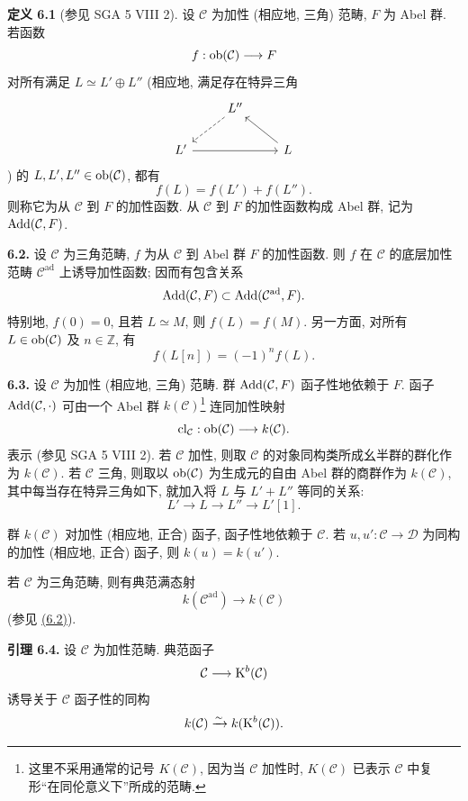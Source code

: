 \textbf{定义 6.1} (参见 SGA 5 VIII 2). 设 \(\mathcal C\) 为加性 (相应地, 三角) 范畴, \(F\) 为 Abel 群. 若函数
\[
  f:\operatorname{ob}(\mathcal C)\longrightarrow F
\]
对所有满足 \(L\simeq L'\oplus L''\) (相应地, 满足存在特异三角
\[
\begin{tikzcd}
& L'' \arrow[dl,dashed] & \\
L' \arrow[rr] && L \arrow[ul]
\end{tikzcd}
\]
) 的 \(L,L',L''\in\operatorname{ob}(\mathcal C)\), 都有
\[
  f(L)=f(L')+f(L'').
\]
则称它为从 \(\mathcal C\) 到 \(F\) 的加性函数. 从 \(\mathcal C\) 到 \(F\) 的加性函数构成 Abel 群, 记为 \(\operatorname{Add}(\mathcal C,F)\).

\textbf{6.2.} 设 \(\mathcal C\) 为三角范畴, \(f\) 为从 \(\mathcal C\) 到 Abel 群 \(F\) 的加性函数. 则 \(f\) 在 \(\mathcal C\) 的底层加性范畴 \(\mathcal C^{\mathrm{ad}}\) 上诱导加性函数; 因而有包含关系
\[
  \operatorname{Add}(\mathcal C,F)\subset \operatorname{Add}(\mathcal C^{\mathrm{ad}},F).
\]
特别地, \(f(0)=0\), 且若 \(L\simeq M\), 则 \(f(L)=f(M)\). 另一方面, 对所有 \(L\in\operatorname{ob}(\mathcal C)\) 及 \(n\in\mathbb Z\), 有
\[
  f(L[n])=(-1)^n f(L)
.
\]


\textbf{6.3.} 设 \(\mathcal C\) 为加性 (相应地, 三角) 范畴. 群 \(\operatorname{Add}(\mathcal C,F)\) 函子性地依赖于 \(F\). 函子 \(\operatorname{Add}(\mathcal C,\cdot)\) 可由一个 Abel 群 \(k(\mathcal C)\)\footnote{这里不采用通常的记号 \(K(\mathcal C)\), 因为当 \(\mathcal C\) 加性时, \(K(\mathcal C)\) 已表示 \(\mathcal C\) 中复形“在同伦意义下”所成的范畴.} 连同加性映射
\[
  \operatorname{cl}_{\mathcal C}:\operatorname{ob}(\mathcal C)\longrightarrow k(\mathcal C).
\]
表示 (参见 SGA 5 VIII 2). 若 \(\mathcal C\) 加性, 则取 \(\mathcal C\) 的对象同构类所成幺半群的群化作为 \(k(\mathcal C)\). 若 \(\mathcal C\) 三角, 则取以 \(\operatorname{ob}(\mathcal C)\) 为生成元的自由 Abel 群的商群作为 \(k(\mathcal C)\), 其中每当存在特异三角如下, 就加入将 \(L\) 与 \(L'+L''\) 等同的关系:
\[
  L'\longrightarrow L\longrightarrow L''\longrightarrow L'[1].
\]

群 \(k(\mathcal C)\) 对加性 (相应地, 正合) 函子, 函子性地依赖于 \(\mathcal C\). 若 \(u,u':\mathcal C\to\mathcal D\) 为同构的加性 (相应地, 正合) 函子, 则 \(k(u)=k(u')\).

若 \(\mathcal C\) 为三角范畴, 则有典范满态射
\[
  k(\mathcal C^{\mathrm{ad}})\longrightarrow k(\mathcal C)
\]
(参见 \hyperlink{sga6.e01.para.6-2}{(6.2)}).

\textbf{引理 6.4.} 设 \(\mathcal C\) 为加性范畴. 典范函子
\[
  \mathcal C\longrightarrow \mathrm K^b(\mathcal C)
\]
诱导关于 \(\mathcal C\) 函子性的同构
\[
  k(\mathcal C)\xrightarrow{\sim} k(\mathrm K^b(\mathcal C)).
\]

